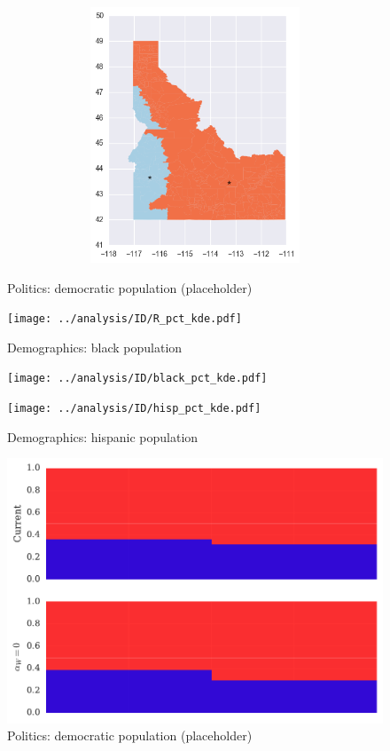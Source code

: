 \begin{figure}[htb!]
\includegraphics[width=5in,height=3in,keepaspectratio]{../maps/ID/static/0_25_after.png}
\end{figure}

\clearpage
\newpage

\begin{figure}[htb!] \centering
\caption{ Politics: democratic population (placeholder)}
\texttt{[image: ../analysis/ID/R\_pct\_kde.pdf]}
\caption{ Demographics: black population }
\texttt{[image: ../analysis/ID/black\_pct\_kde.pdf]}
\caption{ Demographics: hispanic population }
\texttt{[image: ../analysis/ID/hisp\_pct\_kde.pdf]}
\end{figure}

\clearpage
\newpage

\begin{figure}[htb!] \centering
\caption{ Politics: democratic population (placeholder)}
\includegraphics[width=6in]{../analysis/ID/barplot.pdf}
\end{figure}

